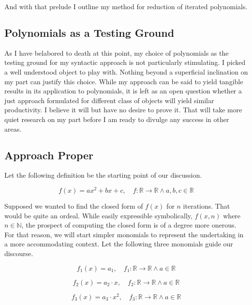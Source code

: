 And with that prelude I outline my method for reduction of iterated
polynomials.

\subsection{Polynomials as a Testing Ground}
As I have belabored to death at this point, my choice of polynomials as the
testing ground for my syntactic approach is not particularly stimulating. I
picked a well understood object to play with. Nothing beyond a superficial
inclination on my part can justify this choice. While my approach can be said
to yield tangible results in its application to polynomials, it is left as an
open question whether a just approach formulated for different class of objects
will yield similar productivity. I believe it will but have no desire to prove
it. That will take more quiet research on my part before I am ready to divulge
any success in other areas.

\subsection{Approach Proper}
Let the following definition be the starting point of our discussion.

\begin{equation}
    f(x)=ax^2 + bx + c, \quad f: \mathbb{R} \rightarrow \mathbb{R} \land a,b,c \in \mathbb{R}
\end{equation}

Supposed we wanted to find the closed form of $f(x)$ for $n$ iterations. That
would be quite an ordeal. While easily expressible symbolically, $f(x,n)$ where
$n \in \mathbb{N}$, the prospect of computing the closed form is of a degree
more onerous. For that reason, we will start simpler monomials to represent the
undertaking in a more accommodating context. Let the following three monomials
guide our discourse.

\begin{equation}
    f_1(x) = a_1, \quad f_1: \mathbb{R} \rightarrow \mathbb{R} \land a \in \mathbb{R}
\end{equation}

\begin{equation}
    f_2(x) = a_2 \cdot x, \quad f_2: \mathbb{R} \rightarrow \mathbb{R} \land a \in \mathbb{R}
\end{equation}

\begin{equation}
    f_3(x) = a_3 \cdot x^2, \quad f_3: \mathbb{R} \rightarrow \mathbb{R} \land a \in \mathbb{R}
\end{equation}

